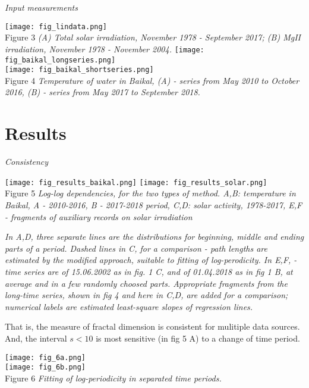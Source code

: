 \documentclass[a4paper]{article}
\begin{document}
\newpage

\textit{Input measurements}

\noindent
\texttt{[image: fig\_lindata.png]}\\
\vskip 12pt
Figure 3 \textit{(A) Total solar irradiation, November 1978 - September 2017; (B) MgII irradiation, November 1978 - November 2004.}
\vskip 12pt
\noindent
\texttt{[image: fig\_baikal\_longseries.png]}\\
\vskip 12pt
\noindent
\texttt{[image: fig\_baikal\_shortseries.png]}\\
\vskip 12pt
Figure 4 \textit{Temperature of water in Baikal, (A) - series from May 2010 to October 2016, (B) - series from May 2017 to September 2018.}

\section*{Results}

\textit{Consistency}

\texttt{[image: fig\_results\_baikal.png]}
\texttt{[image: fig\_results\_solar.png]}\\
Figure 5 \textit{Log-log dependencies, for the two types of method. A,B: temperature in Baikal, A - 2010-2016, B - 2017-2018 period, C,D: solar activity, 1978-2017, E,F - fragments of auxiliary records on solar irradiation}

\textit{\small{In A,D, three separate lines are the distributions for beginning, middle and ending parts of a period. Dashed lines in C, for a comparison - path lengths are estimated by the modified approach,  suitable to fitting of log-perodicity. In E,F, - time series are of 15.06.2002 as in fig. 1 C, and of 01.04.2018 as in fig 1 B, at average and in a few randomly choosed parts. Appropriate fragments from the long-time series, shown in fig 4 and here in C,D, are added for a comparison; numerical labels are estimated least-square slopes of regression lines.}}

That is, the measure of fractal dimension is consistent for mulitiple data sources. And, the interval $s < 10$ is most sensitive (in fig 5 A) to a change of time period.

\newpage

\textit{}
\vskip 12pt

\texttt{[image: fig\_6a.png]}\\
\texttt{[image: fig\_6b.png]}\\
Figure 6 \textit{Fitting of log-periodicity in separated time periods.}
\end{document}
